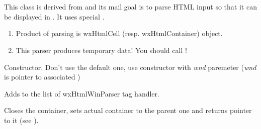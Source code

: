 %
%

\section{}\label{wxhtmlwinparser}

This class is derived from  and 
its mail goal is to parse HTML input so that it can be displayed in
. It uses special 
.


\begin{enumerate}
\item Product of parsing is wxHtmlCell (resp. wxHtmlContainer) object.
\item This parser produces temporary data! You should call 
!
\end{enumerate}






\label{wxhtmlwinparserwxhtmlwinparser}



Constructor. Don't use the default one, use constructor with
{\it wnd} paremeter ({\it wnd} is pointer to associated )

\label{wxhtmlwinparseraddmodule}


Adds  to the list of wxHtmlWinParser tag handler.

\label{wxhtmlwinparserclosecontainer}


Closes the container, sets actual container to the parent one
and returns pointer to it (see ).

